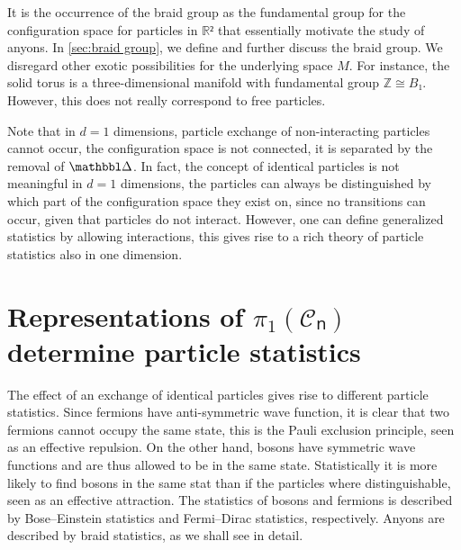 It is the occurrence of the braid group as the fundamental group for the configuration space for particles in $ℝ²$ that essentially motivate the study of anyons. In \cref{sec:braid group}, we define and further discuss the braid group. We disregard other exotic possibilities for the underlying space $M$. For instance, the solid torus is a three-dimensional manifold with fundamental group $ℤ ≅ B₁$. However, this does not really correspond to free particles.

Note that in $d=1$ dimensions, particle exchange of non-interacting particles cannot occur, the configuration space is not connected, it is separated by the removal of $\bbDelta$. In fact, the concept of identical particles is not meaningful in $d = 1$ dimensions, the particles can always be distinguished by which part of the configuration space they exist on, since no transitions can occur, given that particles do not interact. However, one can define generalized statistics by allowing interactions, this gives rise to a rich theory of particle statistics also in one dimension. \cite{polychronakos,myrheim}

















































\section{Representations of \texorpdfstring{$π_1(𝒞ₙ)$}{π₁(Cₙ)} determine particle statistics}

The effect of an exchange of identical particles gives rise to different particle statistics. Since fermions have anti-symmetric wave function, it is clear that two fermions cannot occupy the same state, this is the Pauli exclusion principle, seen as an effective repulsion. On the other hand, bosons have symmetric wave functions and are thus allowed to be in the same state. Statistically it is more likely to find bosons in the same stat than if the particles where distinguishable, seen as an effective attraction. The statistics of bosons and fermions is described by Bose–Einstein statistics and Fermi–Dirac statistics, respectively. Anyons are described by braid statistics, as we shall see in detail.

